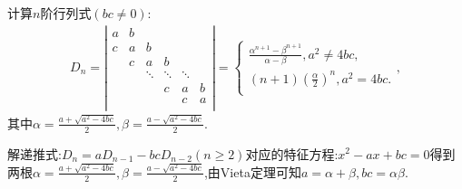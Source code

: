 \documentclass[../../main.tex]{subfiles}%
\begin{document}
\begin{corollary}\label{corollary:对角线元素相同的三对角行列式}
计算$n$阶行列式$(bc\ne0)$:
\begin{equation}
\begin{split}
D_n=\left| \begin{matrix}
a&		b&		&		&		&		\\
c&		a&		b&		&		&		\\
&		c&		a&		b&		&		\\
&		&		\ddots&		\ddots&		\ddots&		\\
&		&		&		c&		a&		b\\
&		&		&		&		c&		a\\
\end{matrix} \right|=\begin{cases}
\frac{\alpha ^{n+1}-\beta ^{n+1}}{\alpha -\beta},a^2\ne 4bc,\\
\left( n+1 \right) \left( \frac{\alpha}{2} \right) ^n,a^2=4bc.\\
\end{cases},
\end{split}
\nonumber
\end{equation}
其中$\alpha =\frac{a+\sqrt{a^2-4bc}}{2},\beta =\frac{a-\sqrt{a^2-4bc}}{2}$.
\end{corollary}
\begin{note}
解递推式:$D_n=aD_{n-1}-bcD_{n-2}(n\ge2)$对应的特征方程:$x^2-ax+bc=0$得到两根$\alpha =\frac{a+\sqrt{a^2-4bc}}{2},\beta =\frac{a-\sqrt{a^2-4bc}}{2}$,由Vieta定理可知$a=\alpha+\beta,bc=\alpha\beta$.
\end{note}
\end{document}
